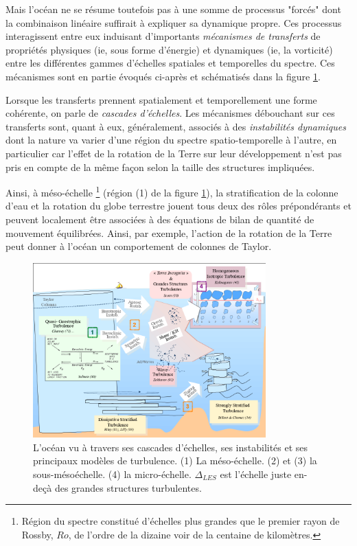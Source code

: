 Mais l'océan ne se résume toutefois pas à une somme de processus "forcés" dont la combinaison linéaire suffirait à expliquer sa dynamique propre. Ces processus interagissent  entre eux induisant d'importants \textit {mécanismes de transferts} de propriétés physiques (ie, sous forme d'énergie) et dynamiques (ie, la vorticité) entre les différentes gammes d'échelles spatiales et temporelles du spectre. Ces mécanismes sont en partie évoqués ci-après et schématisés dans la figure \ref{fig_ocean_scales}. 

Lorsque les transferts prennent spatialement et temporellement une forme cohérente, on parle de \textit{cascades d'échelles}. Les mécanismes débouchant sur ces transferts sont, quant à eux, généralement, associés à des \textit{instabilités dynamiques} dont la nature va varier d'une région du spectre spatio-temporelle à l'autre, en particulier car l'effet de la rotation de la Terre sur leur développement n'est pas pris en compte de la même façon selon la taille des structures impliquées.

Ainsi, à méso-échelle \footnote{Région du spectre constitué d'échelles plus grandes que le premier rayon de Rossby, $Ro$, de l'ordre de la dizaine voir de la centaine de kilomètres.} (région (1) de la figure \ref{fig_ocean_scales}), la stratification de la colonne d'eau et la rotation du globe terrestre jouent tous deux des rôles prépondérants et peuvent localement être associées à des équations de bilan de quantité de mouvement équilibrées. Ainsi, par exemple, l'action de la rotation de la Terre peut donner à l'océan un comportement de colonnes de Taylor.

\begin{figure}[!h]
  \centering
  \includegraphics[width=0.8\textwidth]{./INTRO/Ocean_Scales.png}
  \caption{L'océan vu à travers ses cascades d'échelles, ses instabilités et ses principaux modèles de turbulence. (1) La méso-échelle. (2) et (3) la sous-mésoéchelle. (4) la micro-échelle. $\Delta_{LES}$ est l'échelle juste en-deçà des grandes structures turbulentes.}
  \label{fig_ocean_scales}
\end{figure}

